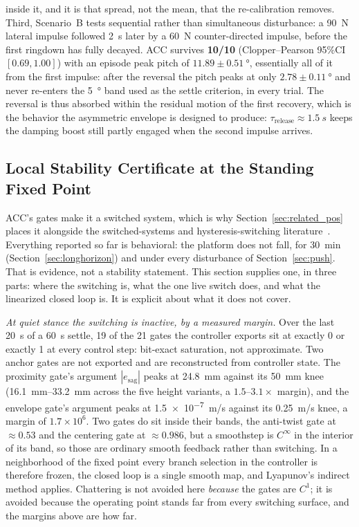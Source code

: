 \documentclass[a4paper,fleqn]{cas-dc}
\begin{document}
inside it, and it is that spread, not the mean, that the re-calibration removes.
Third, Scenario~B tests sequential rather than simultaneous disturbance: a
\SI{90}{N} lateral impulse followed \SI{2}{s} later by a \SI{60}{N} counter-directed
impulse, before the first ringdown has fully decayed. ACC survives
\textbf{10/10} (Clopper--Pearson 95\%CI $[0.69,1.00]$) with an episode peak
pitch of $11.89\pm\SI{0.51}{\degree}$, essentially all of it from the first
impulse: after the reversal the pitch peaks at only
$2.78\pm\SI{0.11}{\degree}$ and never re-enters the \SI{5}{\degree} band used as
the settle criterion, in every trial. The reversal is thus absorbed within the
residual motion of the first recovery, which is the behavior the asymmetric
envelope is designed to produce: $\tau_{\text{release}}{\approx}\SI{1.5}{s}$
keeps the damping boost still partly engaged when the second impulse arrives.

\subsection{Local Stability Certificate at the Standing Fixed Point}
\label{sec:stability}

ACC's gates make it a switched system, which is why Section~\ref{sec:related_pos} places it alongside the switched-systems and hysteresis-switching literature~\cite{liberzon2003switching,hespanha2003hysteresis}. Everything reported so far is behavioral: the platform does not fall, for \SI{30}{min} (Section~\ref{sec:longhorizon}) and under every disturbance of Section~\ref{sec:push}. That is evidence, not a stability statement. This section supplies one, in three parts: where the switching is, what the one live switch does, and what the linearized closed loop is. It is explicit about what it does not cover.

\emph{At quiet stance the switching is inactive, by a measured margin.} Over the last \SI{20}{s} of a \SI{60}{s} settle, \num{19} of the \num{21} gates the controller exports sit at exactly \num{0} or exactly \num{1} at every control step: bit-exact saturation, not approximate. Two anchor gates are not exported and are reconstructed from controller state. The proximity gate's argument $|e_{\text{sag}}|$ peaks at \SI{24.8}{mm} against its \SI{50}{mm} knee (\SIrange{16.1}{33.2}{mm} across the five height variants, a $1.5$--$3.1{\times}$ margin), and the envelope gate's argument peaks at \SI{1.5e-7}{m/s} against its \SI{0.25}{m/s} knee, a margin of $1.7{\times}10^{6}$. Two gates do sit inside their bands, the anti-twist gate at ${\approx}\num{0.53}$ and the centering gate at ${\approx}\num{0.986}$, but a smoothstep is $C^\infty$ in the interior of its band, so those are ordinary smooth feedback rather than switching. In a neighborhood of the fixed point every branch selection in the controller is therefore frozen, the closed loop is a single smooth map, and Lyapunov's indirect method applies. Chattering is not avoided here \emph{because} the gates are $C^1$; it is avoided because the operating point stands far from every switching surface, and the margins above are how far.
\end{document}
